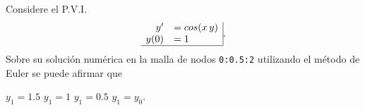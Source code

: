 \begin{pregunta}
\begin{cuerpo}
Considere el P.V.I.
$$
\begin{array}{rl|}
y'	 & =cos(x \, y) \\
y(0) & =1\\ \hline
\end{array}.
$$
Sobre su soluci\'on num\'erica en la malla de nodos \texttt{0:0.5:2} utilizando el m\'etodo de Euler se puede afirmar que
\end{cuerpo}

\begin{multicols}{2}
\begin{alternativas}
{$y_1=1.5$}
{$y_1=1$}
{$y_1=0.5$}
{$y_1=y_0$.}
\end{alternativas}
\end{multicols}
\justificacion{5cm}
\end{pregunta}